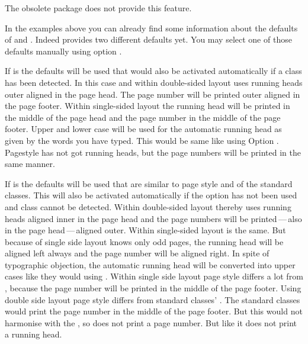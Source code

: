 The obsolete package  does not
provide this feature.%
%
%
%
%
%
%
%


\begin{Declaration}
\end{Declaration}
%
%
In the examples above you can already find some information about the defaults
of  and
. Indeed
 provides two different defaults yet. You may select
one of those defaults manually using option .

If  is  the defaults will be used that
would also be activated automatically if a \KOMAScript{} class has been
detected. In this case and within double-sided layout 
uses running heads outer aligned in the page head. The page number will be
printed outer aligned in the page footer. Within single-sided layout the
running head will be printed in the middle of the page head and the page
number in the middle of the page footer. Upper and lower case will be used for
the automatic running head as given by the words you have typed. This would be
same like using Option
. Pagestyle
 has not got running heads, but the page numbers
will be printed in the same manner.

If  is  the defaults will be used that are
similar to page style  and  of the
standard classes. This  will also be activated automatically
if the option has not been used and \KOMAScript{} class cannot be
detected. Within double-sided layout thereby  uses
running heads aligned inner in the page head and the page numbers will be
printed\,---\,also in the page head\,---\,aligned outer. Within single-sided
layout  is the same. But because of single side layout
knows only odd pages, the running head will be aligned left always and the
page number will be aligned right. In spite of typographic objection, the
automatic running head will be converted into upper cases like they would
using . Within
single side layout page style  differs a lot from
, because the page number will be printed in the middle
of the page footer. Using double side layout page style
 differs from standard classes'
. The standard classes would print the page number in the
middle of the page footer. But this would not harmonise with the
, so  does not print a page
number. But like  it does not print a running head.

